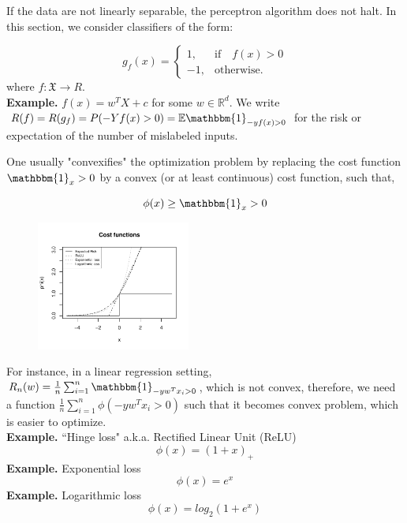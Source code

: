 \documentclass[11pt, english]{article}
\begin{document}
 If the data are not linearly separable, the perceptron algorithm does not halt. In this section, we consider classifiers of the form:
 
 \begin{equation*}
 g_f(x)=\begin{cases}
 1, & \text{if} \quad f(x) > 0\\
 -1, & \text{otherwise}.
 \end{cases}
 \end{equation*}
 where $f:\mathfrak{X} \rightarrow R$.\\
 \textbf{Example.} $f(x) = w^TX+c$ for some $w \in \mathbb{R}^d$.
 We write $R(f) = R(g_f) = P(-Yf(x)>0) = \mathbb{E}\mathbbm{1}_{-yf(x)>0}$ for the risk or expectation of the number of mislabeled inputs.
 
 One usually "convexifies" the optimization problem by replacing the cost function $\mathbbm{1}_x>0$ by a convex (or at least continuous) cost function, such that,
 
 $$\phi(x) \geq \mathbbm{1}_x>0$$
 
 
 \begin{figure}
 	\centering
 	\includegraphics[width=0.45\textwidth]{cost_functions.pdf}
 \end{figure}
 
 For instance, in a linear regression setting, $R_n(w) = \frac{1}{n} \sum_{i=1}^{n} \mathbbm{1}_{-yw^Tx_i>0}$, which is not convex, therefore, we need a function $\frac{1}{n} \sum_{i=1}^{n} \phi(-yw^Tx_i>0)$ such that it becomes convex problem, which is easier to optimize.\\
 
 \textbf{Example.} ``Hinge loss" a.k.a. Rectified Linear Unit (ReLU)\\
 $$\phi(x) = (1+x)_+$$
 \textbf{Example.} Exponential loss\\
 $$\phi(x) = e^x$$
 \textbf{Example.} Logarithmic loss\\
 $$\phi(x) = log_2(1+e^x)$$
 
\end{document}
